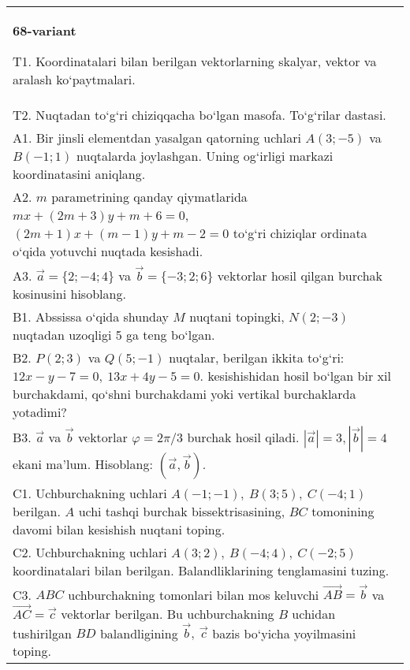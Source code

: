 \documentclass{article}
\begin{document}
\begin{tabular}{m{17cm}}
\textbf{68-variant}
\newline

T1. 
Koordinatalari bilan berilgan vektorlarning skalyar, vektor va aralash ko‘paytmalari. \\
T2. 
Nuqtadan to‘g‘ri chiziqqacha bo‘lgan masofa. To‘g‘rilar dastasi.
 \\
A1. 
Bir jinsli elementdan yasalgan qatorning uchlari
$A (3;-5) $ va $B (-1;1) $ nuqtalarda joylashgan. Uning og‘irligi
markazi koordinatasini aniqlang.
 \\
A2. 
$m$ parametrining qanday qiymatlarida
$mx+ (2m+3) y+m+6=0$, $ (2m+1) x+ (m-1) y+m-2=0$ to‘g‘ri chiziqlar ordinata
o‘qida yotuvchi nuqtada kesishadi.
 \\
A3. 
$\overrightarrow{a} = \{ 2; - 4;4\}$ va $\overrightarrow{b} = \{ - 3;2;6\}$
vektorlar hosil qilgan burchak kosinusini hisoblang.
 \\
B1. 
Abssissa o‘qida shunday $M$ nuqtani topingki,
\(N (2;-3) \) nuqtadan uzoqligi 5 ga teng bo‘lgan.
 \\
B2. 
\(P (2;3) \) va \(Q (5;-1) \) nuqtalar, berilgan ikkita
to‘g‘ri: $12x-y-7=0,\ 13x+4y-5=0$.
kesishishidan hosil bo‘lgan bir xil burchakdami, qo‘shni burchakdami yoki vertikal
burchaklarda yotadimi?
 \\
B3. 
$\vec{a}$ va $\vec{b}$ vektorlar $\varphi = 2\pi/3$ burchak hosil qiladi. $|\vec{a}| = 3,|\vec{b}| = 4$ ekani ma’lum. Hisoblang:
$\left(\vec{a},\vec{b} \right) $.
 \\
C1. 
Uchburchakning uchlari
\(A (- 1; - 1),\ B (3;5),\ C (- 4;1) \) berilgan. $A$ uchi tashqi
burchak bissektrisasining, $BC$ tomonining davomi bilan kesishish
nuqtani toping.
 \\
C2. 
Uchburchakning uchlari
\(A (3;2),\ B (- 4;4),\ C (- 2; 5) \) koordinatalari bilan berilgan.
Balandliklarining tenglamasini tuzing.
 \\
C3. 
\(ABC\) uchburchakning tomonlari bilan mos keluvchi \(\vec{AB} = \vec{b}\) va \(\vec{AC} = \vec{c}\) vektorlar berilgan. Bu uchburchakning \(B\) uchidan tushirilgan \(BD\) balandligining \(\vec{b},\ \vec{c}\) bazis bo‘yicha yoyilmasini toping.
 \\

\end{tabular}
\vspace{1cm}
\end{document}
